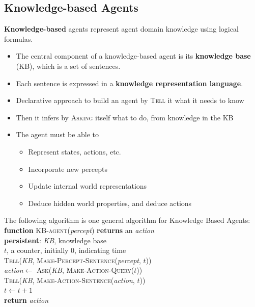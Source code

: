 \documentclass[12pt]{article}
\newcommand{\ind}{\hspace*{15pt}}
\theoremstyle{definition}
\begin{document}
\subsection{Knowledge-based Agents}
\textbf{Knowledge-based} agents represent agent domain knowledge using logical formulas. 
\begin{itemize}
	\item The central component of a knowledge-based agent is its \textbf{knowledge base} (KB), which is a set of sentences.
	\item Each sentence is expressed in a \textbf{knowledge representation language}.
	\item Declarative approach to build an agent by \textsc{Tell} it what it needs to know
	\item Then it infers by \textsc{Asking} itself what to do, from knowledge in the KB
	\item The agent must be able to 
	\begin{itemize}
		\item Represent states, actions, etc.
		\item Incorporate new percepts
		\item Update internal world representations
		\item Deduce hidden world properties, and deduce actions
	\end{itemize}
\end{itemize}
The following algorithm is one general algorithm for Knowledge Based Agents:\\
\textbf{function} \textsc{KB-agent}(\textit{percept}) \textbf{returns} an \textit{action}\\
\ind \textbf{persistent}: \textit{KB}, knowledge base \\
\ind \ind \ind \ind $t$, a counter, initially 0, indicating time\\

\ind \textsc{Tell}(\textit{KB}, \textsc{Make-Percept-Sentence}(\textit{percept}, $t$))\\
\ind \textit{action}$\leftarrow$ \textsc{Ask}(\textit{KB}, \textsc{Make-Action-Query}($t$))\\
\ind \textsc{Tell}(\textit{KB}, \textsc{Make-Action-Sentence}(\textit{action}, $t$))\\
\ind $t\leftarrow t+1$\\
\ind \textbf{return} \textit{action}
\end{document}
